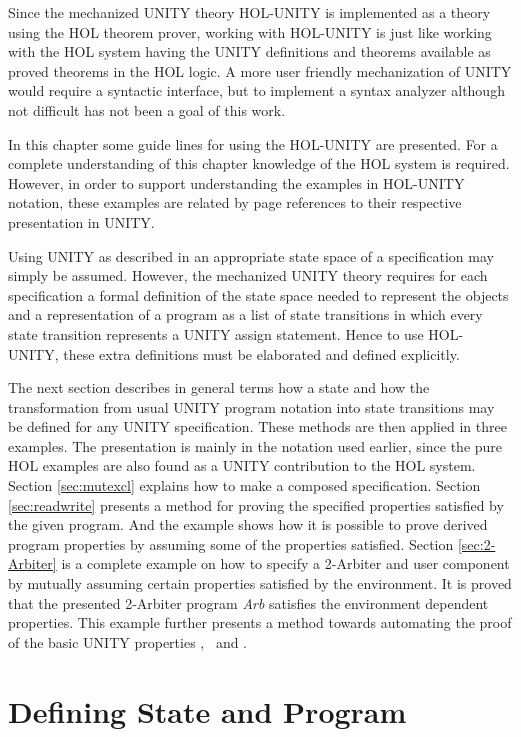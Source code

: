 Since the mechanized UNITY theory HOL-UNITY is implemented as a theory using
the HOL theorem prover, working with HOL-UNITY is just like working with the
HOL system having the UNITY definitions and theorems available as proved
theorems in the HOL logic.  A more user friendly mechanization of UNITY would
require a syntactic interface, but to implement a syntax analyzer although not
difficult has not been a goal of this work.

In this chapter some guide lines for using the HOL-UNITY are presented.  For a
complete understanding of this chapter knowledge of the HOL system is required.
However, in order to support understanding the examples in HOL-UNITY notation, 
these examples are related by page references to their respective presentation
in UNITY.

Using UNITY as described in \cite{CM88} an appropriate state space of a
specification may simply be assumed.  However, the mechanized UNITY theory
requires for each specification a formal definition of the state space needed
to represent the objects and a representation of a program as a list of state
transitions in which every state transition represents a UNITY assign
statement.  Hence to use HOL-UNITY, these extra definitions must be elaborated
and defined explicitly.

The next section describes in general terms how a state and how the
transformation from usual UNITY program notation into state transitions may be
defined for any UNITY specification.  These methods are then applied in three
examples.  The presentation is mainly in the notation used earlier, since the
pure HOL examples are also found as a UNITY contribution to the HOL system.
Section \ref{sec:mutexcl} explains how to make a composed specification.
Section \ref{sec:readwrite} presents a method for proving the specified
properties satisfied by the given program. And the example shows how it is
possible to prove derived program properties by assuming some of the properties
satisfied.  Section \ref{sec:2-Arbiter} is a complete example on how to specify
a 2-Arbiter and user component by mutually assuming certain properties
satisfied by the environment. It is proved that the presented 2-Arbiter program
{\it Arb} satisfies the environment dependent properties.  This example further
presents a method towards automating the proof of the basic UNITY properties
\unless, \stable\ and \ensures.


\section{Defining State and Program}

